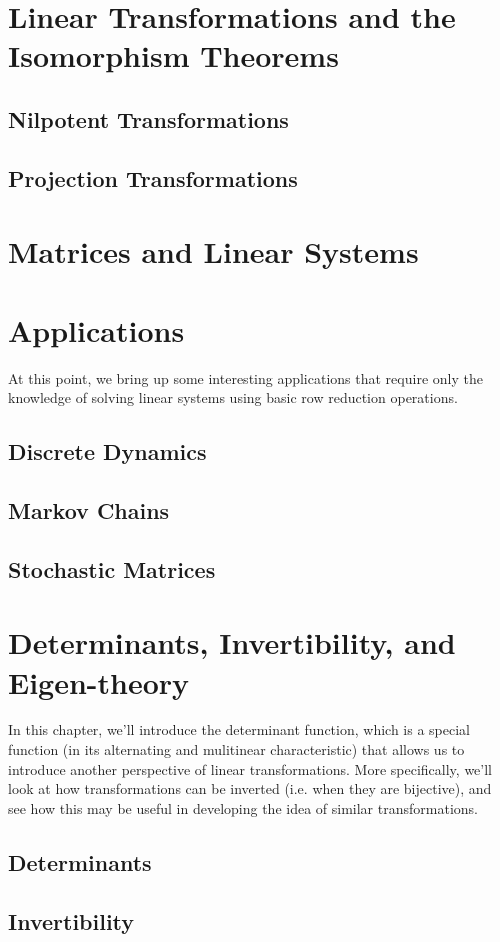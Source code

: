 \documentclass[11pt]{report}
\begin{document}
\chapter{Linear Transformations and the Isomorphism Theorems}
\section{Nilpotent Transformations}
\section{Projection Transformations}
\chapter{Matrices and Linear Systems}


\chapter{Applications}
At this point, we bring up some interesting applications that require only the knowledge of solving linear systems using basic row reduction operations.
\section{Discrete Dynamics}
\section{Markov Chains}
\section{Stochastic Matrices}


\chapter{Determinants, Invertibility, and Eigen-theory}
In this chapter, we'll introduce the determinant function, which is a special function (in its alternating and mulitinear characteristic) that allows us to introduce another perspective of linear transformations. More specifically, we'll look at how transformations can be inverted (i.e. when they are bijective), and see how this may be useful in developing the idea of similar transformations.
\section{Determinants}
\section{Invertibility}
\end{document}
